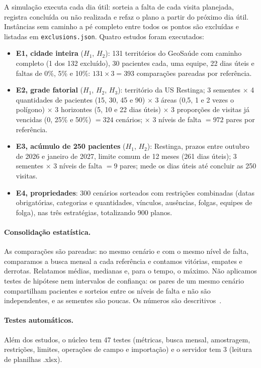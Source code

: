 \documentclass[11pt,a4paper]{article}
\begin{document}
A simulação executa cada dia útil: sorteia a falta de cada visita planejada, registra concluída ou não realizada e refaz o plano a partir do próximo dia útil. Instâncias sem caminho a pé completo entre todos os pontos são excluídas e listadas em \texttt{exclusions.json}. Quatro estudos foram executados:
\begin{itemize}
    \item \textbf{E1, cidade inteira} ($H_1$, $H_2$): 131 territórios do GeoSaúde com caminho completo (1 dos 132 excluído), 30 pacientes cada, uma equipe, 22 dias úteis e faltas de 0\%, 5\% e 10\%: $131 \times 3 = 393$ comparações pareadas por referência.
    \item \textbf{E2, grade fatorial} ($H_1$, $H_2$, $H_3$): território da US Restinga; 3 sementes $\times$ 4 quantidades de pacientes (15, 30, 45 e 90) $\times$ 3 áreas (0,5, 1 e 2 vezes o polígono) $\times$ 3 horizontes (5, 10 e 22 dias úteis) $\times$ 3 proporções de visitas já vencidas (0, 25\% e 50\%) $= 324$ cenários; $\times$ 3 níveis de falta $= 972$ pares por referência.
    \item \textbf{E3, acúmulo de 250 pacientes} ($H_1$, $H_2$): Restinga, prazos entre outubro de 2026 e janeiro de 2027, limite comum de 12 meses (261 dias úteis); 3 sementes $\times$ 3 níveis de falta $= 9$ pares; mede os dias úteis até concluir as 250 visitas.
    \item \textbf{E4, propriedades}: 300 cenários sorteados com restrições combinadas (datas obrigatórias, categorias e quantidades, vínculos, ausências, folgas, equipes de folga), nas três estratégias, totalizando 900 planos.
\end{itemize}

\paragraph{Consolidação estatística.} As comparações são pareadas: no mesmo cenário e com o mesmo nível de falta, comparamos a busca mensal a cada referência e contamos vitórias, empates e derrotas. Relatamos médias, medianas e, para o tempo, o máximo. Não aplicamos testes de hipótese nem intervalos de confiança: os pares de um mesmo cenário compartilham pacientes e sorteios entre os níveis de falta e não são independentes, e as sementes são poucas. Os números são descritivos~\cite{wohlin2012}.

\paragraph{Testes automáticos.} Além dos estudos, o núcleo tem 47 testes (métricas, busca mensal, amostragem, restrições, limites, operações de campo e importação) e o servidor tem 3 (leitura de planilhas .xlsx).
\end{document}
